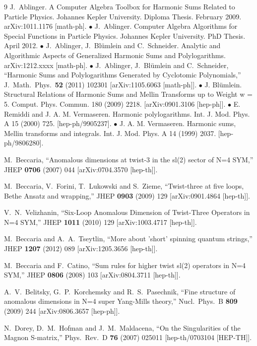 \documentclass[a4paper,11pt]{article}
\numberwithin{equation}{section}
\begin{document}
\begin{thebibliography} {9}
  J.~Ablinger.
  A Computer Algebra Toolbox for Harmonic Sums Related to Particle Physics. Johannes Kepler University. Diploma Thesis. February 2009.
  arXiv:1011.1176 [math-ph].   $\bullet$
J.~Ablinger. Computer Algebra Algorithms for Special Functions in Particle Physics. Johannes Kepler University. PhD Thesis. April 2012. $\bullet$
J.~Ablinger, J.~Bl\"umlein and C.~Schneider. Analytic and Algorithmic Aspects of Generalized Harmonic Sums and Polylogarithms. arXiv:1212.xxxx [math-ph].
$\bullet$
  J.~Ablinger, J.~Bl\"umlein and C.~Schneider,
  ``Harmonic Sums and Polylogarithms Generated by Cyclotomic Polynomials,''
  J.\ Math.\ Phys.\  {\bf 52} (2011) 102301
[arXiv:1105.6063 [math-ph]].
$\bullet$
J. Bl\"umlein. Structural Relations of Harmonic Sums and Mellin Transforms up to Weight w = 5. Comput. Phys. Commun. 180 (2009) 2218. [arXiv:0901.3106 [hep-ph]].
$\bullet$
E. Remiddi and J. A. M. Vermaseren. Harmonic polylogarithms. Int. J. Mod. Phys. A 15 (2000) 725. [hep-ph/9905237].
$\bullet$
J. A. M. Vermaseren. Harmonic sums, Mellin transforms and integrals. Int. J. Mod. Phys. A 14 (1999) 2037. [hep-ph/9806280].

  M.~Beccaria,
  ``Anomalous dimensions at twist-3 in the sl(2) sector of N=4 SYM,''
  JHEP {\bf 0706} (2007) 044
  [arXiv:0704.3570 [hep-th]].

  M.~Beccaria, V.~Forini, T.~Lukowski and S.~Zieme,
  ``Twist-three at five loops, Bethe Ansatz and wrapping,''
  JHEP {\bf 0903} (2009) 129
  [arXiv:0901.4864 [hep-th]].

  V.~N.~Velizhanin,
  ``Six-Loop Anomalous Dimension of Twist-Three Operators in N=4 SYM,''
  JHEP {\bf 1011} (2010) 129
  [arXiv:1003.4717 [hep-th]].

  M.~Beccaria and A.~A.~Tseytlin,
  ``More about 'short' spinning quantum strings,''
  JHEP {\bf 1207} (2012) 089
  [arXiv:1205.3656 [hep-th]].

  M.~Beccaria and F.~Catino,
  ``Sum rules for higher twist sl(2) operators in N=4 SYM,''
  JHEP {\bf 0806} (2008) 103
  [arXiv:0804.3711 [hep-th]].

  A.~V.~Belitsky, G.~P.~Korchemsky and R.~S.~Pasechnik,
  ``Fine structure of anomalous dimensions in N=4 super Yang-Mills theory,''
  Nucl.\ Phys.\ B {\bf 809} (2009) 244
  [arXiv:0806.3657 [hep-ph]].

  N.~Dorey, D.~M.~Hofman and J.~M.~Maldacena,
  ``On the Singularities of the Magnon S-matrix,''
  Phys.\ Rev.\ D {\bf 76} (2007) 025011
  [hep-th/0703104 [HEP-TH]].


\end{thebibliography}
\end{document}
